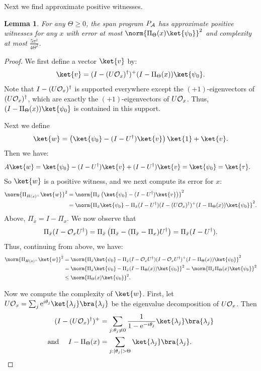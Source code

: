 \documentclass[11pt]{article}
\numberwithin{equation}{section}
\newtheorem{lemma}[theorem]{Lemma}
\theoremstyle{definition}
\theoremstyle{plain}
\newcommand{\eee}{\mathrm e}
\begin{document}
Next we find approximate positive witnesses. 

\begin{lemma}\label{lem:monotone-alg-pos}
For any $\Theta\geq 0$, the span program $P_{\cal A}$ has approximate positive witnesses for any $x$ with error at most $\norm{\Pi_\Theta(x)\ket{\psi_0}}^2$ and complexity at most $\frac{5\pi^2}{4\Theta^2}$. 
\end{lemma}
\begin{proof}
We first define a vector $\ket{v}$ by:
$$\ket{v} = (I-(U{\cal O}_x)^\dagger)^+(I-\Pi_\Theta(x))\ket{\psi_0}.$$
Note that $I-(U{\cal O}_x)^\dagger$ is supported everywhere except the $(+1)$-eigenvectors of $(U{\cal O}_x)^\dagger$, which are exactly the $(+1)$-eigenvectors of $U{\cal O}_x$. Thus, $(I-\Pi_\Theta(x))\ket{\psi_0}$ is contained in this support. 

Next we define
$$\ket{w}=\left(\ket{\psi_0}-(I-U^\dagger)\ket{v}\right)\ket{1}+\ket{v}.$$
Then we have:
\begin{align*}
A\ket{w} &= \ket{\psi_0} - (I-U^\dagger)\ket{v} + (I-U^\dagger)\ket{v} = \ket{\psi_0}=\ket{\tau}.
\end{align*}
So $\ket{w}$ is a positive witness, and we next compute its error for $x$:
\begin{align*}
\norm{\Pi_{H(x)^\bot}\ket{w}}^2 &= \norm{\Pi_{\bar x}\left(\ket{\psi_0} - (I-U^\dagger)\ket{v}\right)}^2\\
&= \norm{\Pi_{\bar x}\ket{\psi_0} - \Pi_{\bar x}(I-U^\dagger)(I-(U{\cal O}_x)^{\dagger})^+(I-\Pi_\Theta(x))\ket{\psi_0}}^2.
\end{align*}
Above, $\Pi_{\bar{x}}=I-\Pi_x$. We now observe that
$$\Pi_{\bar{x}}(I-{\cal O}_xU^\dagger)=\Pi_{\bar x}\left(\Pi_{\bar{x}} - (\Pi_{\bar{x}}-\Pi_x)U^\dagger\right)=\Pi_{\bar x}(I-U^\dagger).$$
Thus, continuing from above, we have:
\begin{align*}
\norm{\Pi_{H(x)^\bot}\ket{w}}^2&= \norm{\Pi_{\bar x}\ket{\psi_0} - \Pi_{\bar x}(I-{\cal O}_xU^\dagger)(I-{\cal O}_xU^\dagger)^+(I-\Pi_\Theta(x))\ket{\psi_0}}^2\\
&= \norm{\Pi_{\bar x}\ket{\psi_0} - \Pi_{\bar x}(I-\Pi_\Theta(x))\ket{\psi_0}}^2
= \norm{\Pi_{\bar x}\Pi_\Theta(x)\ket{\psi_0}}^2\\
&\leq \norm{\Pi_{\Theta}(x)\ket{\psi_0}}^2.
\end{align*}


Now we compute the complexity of $\ket{w}$. First, let $U{\cal O}_x=\sum_j \eee^{i\theta_j}\ket{\lambda_j}\bra{\lambda_j}$ be the eigenvalue decomposition of $U{\cal O}_x$. Then 
\begin{align*}
(I-(U{\cal O}_x)^\dagger)^+ &= \sum_{j:\theta_j\neq 0} \frac{1}{1-\eee^{-i\theta_j}}\ket{\lambda_j}\bra{\lambda_j}\\
\mbox{and }\quad I-\Pi_{\Theta}(x) &=\sum_{j:|\theta_j|>\Theta}\ket{\lambda_j}\bra{\lambda_j}.
\end{align*}


\end{proof}
\end{document}
